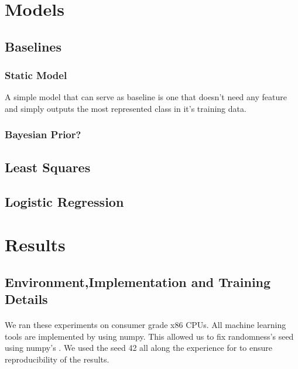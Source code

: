 \documentclass[sigconf, nonacm]{acmart}
\begin{document}
\section{Models}
\subsection{Baselines}
\subsubsection{Static Model} A simple model that can serve as baseline is one that doesn't need any feature and simply outputs the most represented class in it's training data.
\subsubsection{Bayesian Prior?}%
\subsection{Least Squares}
\subsection{Logistic Regression}



\section{Results}
\subsection{Environment,Implementation and Training Details}
\paragraph{}We ran these experiments on consumer grade x86 CPUs. All machine learning tools are implemented by using numpy. This allowed us to fix randomness's seed using numpy's . We used the seed 42 all along the experience for to ensure reproducibility of the results. 
\end{document}
